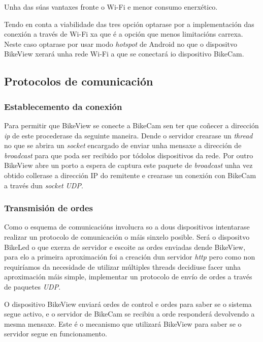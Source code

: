 {\begin{itemize}
  Unha das súas vantaxes fronte o Wi-Fi e menor consumo enerxético.
\end{itemize}

Tendo en conta a viabilidade das tres opción optarase por a implementación das conexión a través de Wi-Fi xa que é a opción que menos limitacións carrexa. Neste caso optarase por usar modo \emph{hotspot} de Android no que o dispositvo BikeView xerará unha rede Wi-Fi a que se conectará io dispositivo BikeCam.

\subsection{Protocolos de comunicación}

\subsubsection{Establecemento da conexión}

Para permitir que BikeView se conecte a BikeCam sen ter que coñecer a dirección \emph{ip} de este procederase da seguinte maneira. Dende o servidor crearase un \emph{thread} no que se abrira un \emph{socket} encargado de enviar unha mensaxe a dirección de \emph{broadcast} para que poda ser recibido por tódolos dispositivos da rede. Por outro BikeView abre un porto a espera de captura este paquete de \emph{broadcast} unha vez obtido collerase a dirección IP do remitente e crearase un conexión con BikeCam a través dun \emph{socket} \emph{UDP}.

\subsubsection{Transmisión de ordes}
Como o esquema de comunicacións involucra so a dous dispositivos intentarase realizar un protocolo de comunicación o máis sinxelo posible. Será o dispositvo BikeLed o que exerza de servidor e escoite as ordes enviadas dende BikeView, para elo a primeira aproximación foi a creación dun servidor \emph{http} pero como non requiríamos da necesidade de utilizar múltiples threads decidiuse facer unha aproximación máis simple, implementar un protocolo de envío de ordes a través de paquetes \emph{UDP}.

 O dispositivo BikeView enviará ordes de control e ordes para saber se o sistema segue activo, e o servidor de BikeCam se recibiu a orde responderá devolvendo a mesma mensaxe. Este é o mecanismo que utilizará BikeView para saber se o servidor segue en funcionamento.

}
